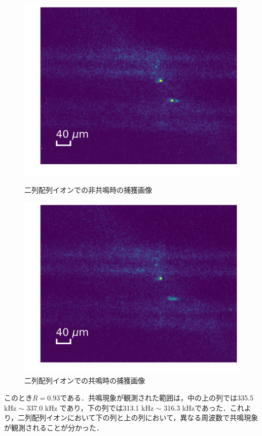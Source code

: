 \begin{figure}[h]
	\begin{minipage}{0.5\linewidth}
		\begin{center}
			\includegraphics[width = 0.8\columnwidth]{./results/figure/2D_off_resonance.jpg}
			\caption{二列配列イオンでの非共鳴時の捕獲画像}
			\label{fig:2D_off_resonance}
		\end{center}
	\end{minipage}
	\begin{minipage}{0.5\linewidth}
		\begin{center}
			\includegraphics[width = 0.8\columnwidth]{./results/figure/2D_resonance.jpg}
			\caption{二列配列イオンでの共鳴時の捕獲画像}
			\label{fig:2D_resonance}
		\end{center}
	\end{minipage}
\end{figure}

このとき$R = 0.93$である．共鳴現象が観測された範囲は，中の上の列では335.5 kHz $\sim$ 337.0 kHz であり，下の列では313.1 kHz $\sim$ 316.3 kHzであった．これより，二列配列イオンにおいて下の列と上の列において，異なる周波数で共鳴現象が観測されることが分かった．